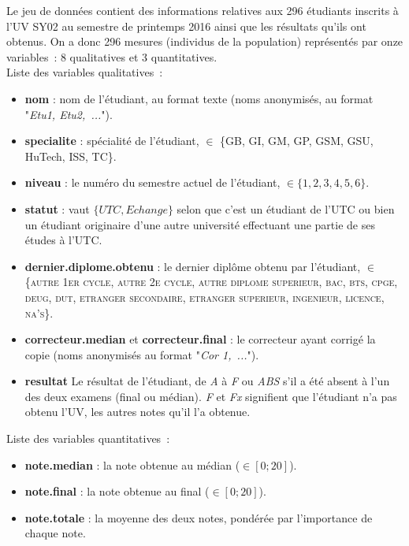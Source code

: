 \documentclass[a4paper,10pt]{report}
\begin{document}
Le jeu de données contient des informations relatives aux 296 étudiants inscrits à l’UV SY02 au semestre de printemps 2016 ainsi que les résultats qu'ils ont obtenus. On a donc 296 mesures (individus de la population) représentés par onze variables~: 8 qualitatives et 3 quantitatives.\\
Liste des variables qualitatives~:
\begin{itemize}
	\item \textbf{nom} : nom de l'étudiant, au format texte (noms anonymisés, au format "\textit{Etu1, Etu2,~...}").
	\item \textbf{specialite} : spécialité de l'étudiant, $\in$ \{GB, GI, GM, GP, GSM, GSU, HuTech, ISS, TC\}.
	\item \textbf{niveau} : le numéro du semestre actuel de l'étudiant, $\in \{1,2,3,4,5,6\}$.
	\item \textbf{statut} : vaut $ \{UTC,Echange\} $ selon que c'est un étudiant de l'UTC ou bien un étudiant originaire d'une autre université effectuant une partie de ses études à l'UTC.
	\item \textbf{dernier.diplome.obtenu} : le dernier diplôme obtenu par l'étudiant, $\in$ \{\textsc{autre 1er cycle, autre 2e cycle, autre diplome superieur, bac, bts, cpge, deug, dut, etranger secondaire, etranger superieur, ingenieur, licence, na's}\}.
	\item \textbf{correcteur.median} et \textbf{correcteur.final} : le correcteur ayant corrigé la copie (noms anonymisés au format "\textit{Cor 1,~...}").
	\item \textbf{resultat} Le résultat de l'étudiant, de \textit{A} à \textit{F} ou \textit{ABS} s'il a été absent à l'un des deux examens (final ou médian). \textit{F} et \textit{Fx} signifient que l'étudiant n'a pas obtenu l'UV, les autres notes qu'il l'a obtenue.
\end{itemize}
Liste des variables quantitatives~:
\begin{itemize}
	\item \textbf{note.median} : la note obtenue au médian ($ \in [0;20] $).
	\item \textbf{note.final} : la note obtenue au final ($ \in [0;20] $).
	\item \textbf{note.totale} : la moyenne des deux notes, pondérée par l'importance de chaque note.
\end{itemize}
\end{document}
